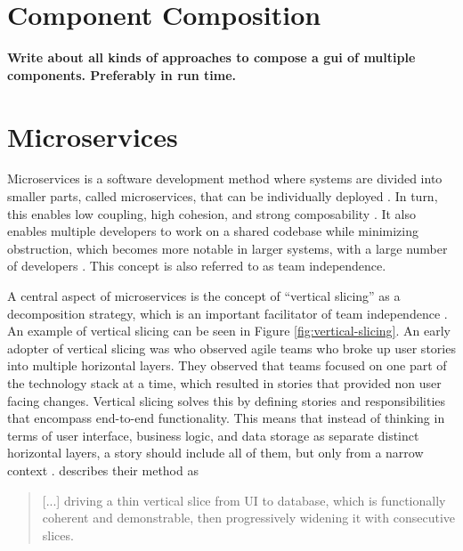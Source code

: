 \section{Component Composition}

\textbf{Write about all kinds of approaches to compose a gui of multiple components. Preferably in run time.
}

\section{Microservices}
Microservices is a software development method where systems are divided into smaller parts, called microservices, that can be individually deployed \cite{Newman2015a}. In turn, this enables low coupling, high cohesion, and strong composability \cite[ch.~1]{Newman2015a}. It also enables multiple developers to work on a shared codebase while minimizing obstruction, which becomes more notable in larger systems, with a large number of developers \cite{Newman2015a}. This concept is also referred to as team independence.


A central aspect of microservices is the concept of ``vertical slicing'' as a decomposition strategy, which is an important facilitator of team independence \cite{Familiar2015}. An example of vertical slicing can be seen in Figure \ref{fig:vertical-slicing}. An early adopter of vertical slicing was \citeauthor{Ratner2011} who observed agile teams who broke up user stories into multiple horizontal layers. They observed that teams focused on one part of the technology stack at a time, which resulted in stories that provided non user facing changes. Vertical slicing solves this by defining stories and responsibilities that encompass end-to-end functionality. This means that instead of thinking in terms of user interface, business logic, and data storage as separate distinct horizontal layers, a story should include all of them, but only from a narrow context \cite{Ratner2011}. \citeauthor{Ratner2011} describes their method as \blockquote{[...] driving a thin vertical slice from UI to database, which is functionally coherent and demonstrable, then progressively widening it with consecutive slices. \cite{Ratner2011}}

